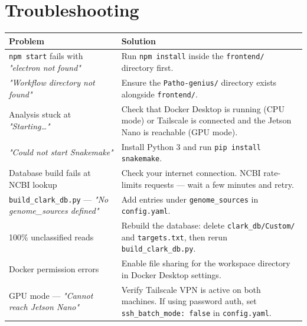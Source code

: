 \documentclass[12pt,a4paper]{report}
\begin{document}
\chapter{Troubleshooting}

\begin{longtable}{p{5.5cm} p{9cm}}
  \toprule
  \textbf{Problem} & \textbf{Solution} \\
  \midrule
  \endhead
  \texttt{npm start} fails with \textit{"electron not found"} &
  Run \texttt{npm install} inside the \texttt{frontend/} directory first. \\[4pt]

  \textit{"Workflow directory not found"} &
  Ensure the \texttt{Patho-genius/} directory exists alongside \texttt{frontend/}. \\[4pt]

  Analysis stuck at \textit{"Starting\ldots"} &
  Check that Docker Desktop is running (CPU mode) or Tailscale is connected and the Jetson Nano is reachable (GPU mode). \\[4pt]

  \textit{"Could not start Snakemake"} &
  Install Python 3 and run \texttt{pip install snakemake}. \\[4pt]

  Database build fails at NCBI lookup &
  Check your internet connection. NCBI rate-limits requests — wait a few minutes and retry. \\[4pt]

  \texttt{build\_clark\_db.py} — \textit{"No genome\_sources defined"} &
  Add entries under \texttt{genome\_sources} in \texttt{config.yaml}. \\[4pt]

  100\% unclassified reads &
  Rebuild the database: delete \texttt{clark\_db/Custom/} and \texttt{targets.txt}, then rerun \texttt{build\_clark\_db.py}. \\[4pt]

  Docker permission errors &
  Enable file sharing for the workspace directory in Docker Desktop settings. \\[4pt]

  GPU mode — \textit{"Cannot reach Jetson Nano"} &
  Verify Tailscale VPN is active on both machines. If using password auth, set \texttt{ssh\_batch\_mode: false} in \texttt{config.yaml}. \\[4pt]


\end{longtable}
\end{document}
